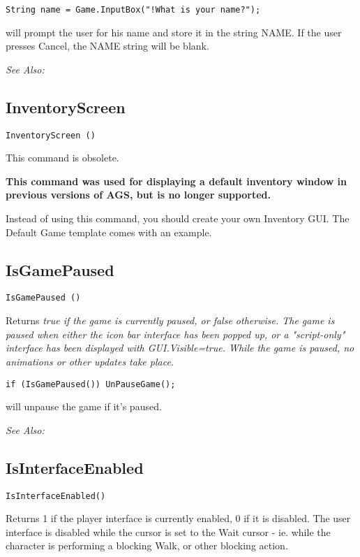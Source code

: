 \begin{verbatim}
String name = Game.InputBox("!What is your name?");
\end{verbatim}
will prompt the user for his name and store it in the string NAME. If the user presses Cancel,
the NAME string will be blank.

\it{See Also:} 


\subsection{InventoryScreen}\label{InventoryScreen}%

\begin{verbatim}
InventoryScreen ()
\end{verbatim}

This command is obsolete.

\bf{This command was used for displaying a default inventory window
in previous versions of AGS, but is no longer supported.}

Instead of using this command, you should create your own Inventory GUI.
The Default Game template comes with an example.


\subsection{IsGamePaused}\label{IsGamePaused}%

\begin{verbatim}
IsGamePaused ()
\end{verbatim}
Returns \it{true} if the game is currently paused, or \it{false} otherwise.
The game is paused when either the icon bar interface has been popped up,
or a "script-only" interface has been displayed with GUI.Visible=true. While
the game is paused, no animations or other updates take place.

\begin{verbatim}
if (IsGamePaused()) UnPauseGame();
\end{verbatim}
will unpause the game if it's paused.

\it{See Also:} 


\subsection{IsInterfaceEnabled}\label{IsInterfaceEnabled}%

\begin{verbatim}
IsInterfaceEnabled()
\end{verbatim}
Returns 1 if the player interface is currently enabled, 0 if it is disabled.
The user interface is disabled while the cursor is set to the Wait cursor -
ie. while the character is performing a blocking Walk, or other blocking
action.

